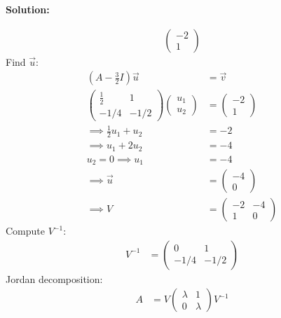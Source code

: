 \documentclass[12pt]{article}
\newenvironment{solution}{
    \textbf{Solution:}
    
}{
    
    \vspace{2em}
}
\begin{document}
\begin{solution}
\[\begin{aligned}
\begin{pmatrix}
                -2 \\
                1
            \end{pmatrix}
        \end{aligned}
    \]
    Find \(\vec{u}\):
    \[
        \begin{aligned}
            (A - \frac{3}{2}I)\vec{u} &= \vec{v}\\
            \begin{pmatrix}
                \frac{1}{2} & 1 \\
                -1/4 & -1/2
            \end{pmatrix} \begin{pmatrix}
                u_1 \\
                u_2
            \end{pmatrix} &= \begin{pmatrix}
                -2 \\
                1
            \end{pmatrix}\\
            \implies \frac{1}{2}u_1 + u_2 &= -2\\
            \implies u_1 + 2u_2 &= -4\\
            u_2 = 0 \implies u_1 &= -4\\
            \implies \vec{u} &=\begin{pmatrix}
                -4 \\
                0
            \end{pmatrix}\\
            \implies V &= \begin{pmatrix}
                -2 & -4 \\
                1 & 0
            \end{pmatrix}
        \end{aligned}
    \]
    Compute \(V^{-1}\):
    \[
        \begin{aligned}
            V^{-1} &= \begin{pmatrix}
                0 & 1 \\
                -1/4 & -1/2
            \end{pmatrix}
        \end{aligned}
    \]
    Jordan decomposition:
    \[
        \begin{aligned}
            A &= V \begin{pmatrix}
                \lambda & 1 \\
                0 & \lambda
            \end{pmatrix} V^{-1}\\

\end{aligned}\]
\end{solution}
\end{document}
